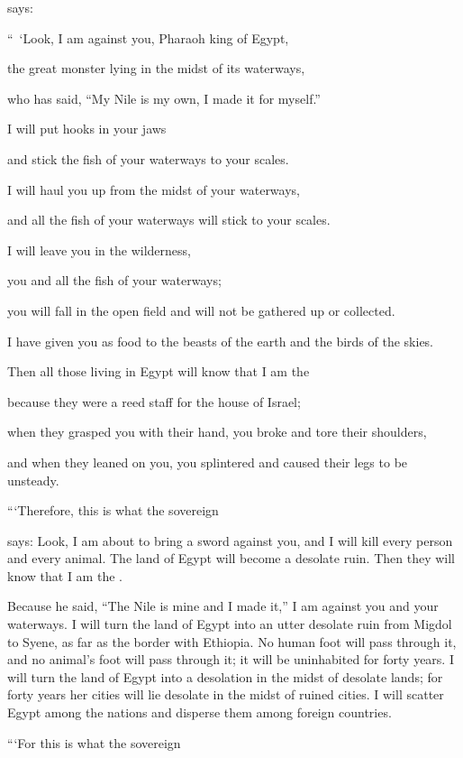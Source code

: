 {{}
says:
\par }{\Q “ ‘Look,
I am against
you, Pharaoh
king
of Egypt,
\par }{\Q the great
monster
lying
in the midst
of its waterways,
\par }{\Q who
has said,
“My Nile
is my own, I
made it for myself.”
\par }{\Q {}I will put
hooks
in your jaws
\par }{\Q and stick
the fish
of your waterways
to your scales.
\par }{\Q I will haul you up
from the midst
of your waterways,
\par }{\Q and all
the fish
of your waterways will
stick
to your scales.
\par }{\Q {}I will leave
you in the wilderness,
\par }{\Q you and all
the fish
of your waterways;
\par }{\Q you will fall
in
the open
field
and will not
be gathered up
or
collected.
\par }{\Q I have given
you as food
to the beasts
of the earth
and the birds
of the skies.
\par }{\Q {}Then all
those living
in Egypt
will know
that
I am
the {}
\par }{\Q because
they were a reed
staff
for the house
of Israel;
\par }{\Q {}when they grasped
you with their hand,
you broke
and tore their shoulders,
\par }{\Q and when they leaned
on
you, you splintered
and caused their legs to be
unsteady.
\par }{\PP {}“‘Therefore,
this is what
the sovereign

{}
says: Look,
I am about to bring
a sword
against you, and I will kill
every person
and every animal.
The land
of Egypt
will become a desolate
ruin.
Then they will know
that
I am
the {}.
\par }{\PP Because
he said,
“The Nile
is mine and I
made it,”
I am against
you and your waterways.
I will turn
the land
of Egypt
into an utter
desolate
ruin
from Migdol
to Syene,
as far
as the border
with Ethiopia.
No
human
foot
will pass
through it, and no
animal’s
foot
will pass
through it; it will be uninhabited
for forty
years.
I will turn
the
land
of Egypt
into a desolation
in the midst
of desolate
lands;
for forty
years
her cities
will lie desolate
in the midst
of ruined
cities.
I will scatter
Egypt
among the nations
and disperse
them among foreign countries.
\par }{\PP {}“‘For
this is what
the sovereign

}
